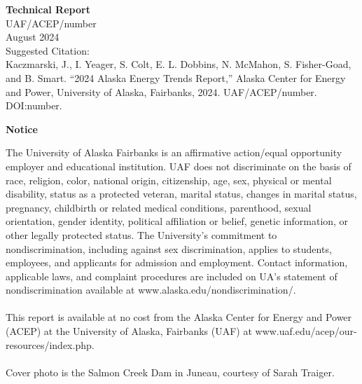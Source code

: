 \newpage
\noindent
{\normalsize\bfseries Technical Report} \\
UAF/ACEP/number \\ 
\vspace{3ex}
August 2024 \\
Suggested Citation: \\
Kaczmarski, J., I. Yeager, S. Colt, E. L. Dobbins, N. McMahon, S. Fisher-Goad, and B. Smart. “2024 Alaska Energy Trends Report,” Alaska Center for Energy and Power, University of Alaska, Fairbanks, 2024. UAF/ACEP/number. DOI:number. 

\newpage
\vspace{30ex}
\noindent
{\centering
\bfseries\normalsize Notice
\par
}
\small The University of Alaska Fairbanks is an affirmative action/equal opportunity employer and educational institution. UAF does not discriminate on the basis of race, religion, color, national origin, citizenship, age, sex, physical or mental disability, status as a protected veteran, marital status, changes in marital status, pregnancy, childbirth or related medical conditions, parenthood, sexual orientation, gender identity, political affiliation or belief, genetic information, or other legally protected status. The University's commitment to nondiscrimination, including against sex discrimination, applies to students, employees, and applicants for admission and employment. Contact information, applicable laws, and complaint procedures are included on UA's statement of nondiscrimination available at www.alaska.edu/nondiscrimination/. \\
\\
\small This report is available at no cost from the Alaska Center for Energy and Power (ACEP) at the University of Alaska, Fairbanks (UAF) at www.uaf.edu/acep/our-resources/index.php. \\
\\
\small Cover photo is the Salmon Creek Dam in Juneau, courtesy of Sarah Traiger.